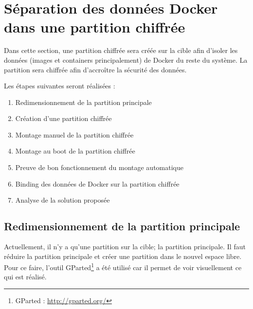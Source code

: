\documentclass[11pt,a4paper,oneside]{report}
\begin{document}
\section{Séparation des données Docker dans une partition chiffrée}\label{partition_chiffree}
Dans cette section, une partition chiffrée sera créée sur la cible afin d'isoler les données (images et containers principalement) de Docker du reste du système. La partition sera chiffrée afin d'accroître la sécurité des données.

Les étapes suivantes seront réalisées :
\begin{enumerate}
\item Redimensionnement de la partition principale
\item Création d'une partition chiffrée
\item Montage manuel de la partition chiffrée
\item Montage au boot de la partition chiffrée
\item Preuve de bon fonctionnement du montage automatique
\item Binding des données de Docker sur la partition chiffrée
\item Analyse de la solution proposée
\end{enumerate}

\subsection{Redimensionnement de la partition principale}
Actuellement, il n'y a qu'une partition sur la cible; la partition principale. Il faut réduire la partition principale et créer une partition dans le nouvel espace libre. Pour ce faire, l'outil GParted\footnote{GParted : \url{http://gparted.org/}} a été utilisé car il permet de voir visuellement ce qui est réalisé.
\end{document}
